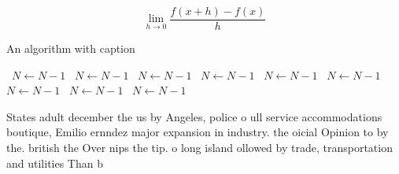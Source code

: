 \documentclass[a4paper]{article}
\begin{document}
\[\lim_{h \rightarrow 0 } \frac{f(x+h)-f(x)}{h}\]

\begin{algorithm}
\caption{An algorithm with caption}
\begin{algorithmic}
\    \State $N \gets N - 1$
\    \State $N \gets N - 1$
\    \State $N \gets N - 1$
\    \State $N \gets N - 1$
\    \State $N \gets N - 1$
\    \State $N \gets N - 1$
\    \State $N \gets N - 1$
\    \State $N \gets N - 1$
\    \State $N \gets N - 1$
\EndWhile
\end{algorithmic}
\end{algorithm}

States adult december the us by Angeles, police o ull service accommodations boutique, Emilio ernndez major expansion in industry. the oicial Opinion to by the. british the Over nips the tip. o long island ollowed by trade, transportation and utilities Than b
\end{document}
